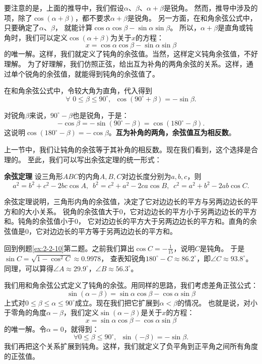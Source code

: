 \documentclass[12pt,UTF8]{ctexbook}
\begin{document}
要注意的是，上面的推导中，我们假设$\alpha$、$\beta$、$\alpha + \beta$是锐角。
然而，推导中涉及的项，除了$\cos(\alpha + \beta)$，都不要求$\alpha + \beta$是锐角。
另一方面，在和角余弦公式中，只要确定了$\alpha$、$\beta$，
就能计算$\cos \alpha \cos \beta - \sin\alpha \sin \beta$。
所以，$\alpha + \beta$是直角或钝角时，我们可以定义$\cos(\alpha + \beta)$为关于$x$的方程：
$$  x = \cos \alpha \cos \beta - \sin\alpha \sin \beta $$
的唯一解。这样，我们就定义了钝角的余弦值。当然，这样定义钝角余弦值，不好理解。
为了好理解，我们仿照正弦，给出互为补角的两角余弦的关系。这样，通过单个锐角的余弦值，就能得到钝角的余弦值了。

在和角余弦公式中，令较大角为直角，代入得到
$$  \forall \,\, 0 \leqslant \beta \leqslant 90^\circ , \,\,\, \cos(90^\circ + \beta) = - \sin\beta. $$

对锐角$\beta$来说，$90^\circ - \beta$也是锐角，于是：
$$ -\cos \beta = - \sin(90^\circ - \beta) = \cos(180^\circ - \beta). $$
这说明$ \cos(180^\circ - \beta) =  -\cos \beta$。\textbf{互为补角的两角，余弦值互为相反数}。

上一节中，我们让钝角的余弦等于其补角的相反数。现在我们看到，这个选择是合理的。
至此，我们可以写出余弦定理的统一形式：

\begin{tm}{\textbf{余弦定理}}\label{tm:2-4-10}
    设三角形$ABC$的内角$A,B,C$对边长度分别为$a,b,c$，则
    $$ a^2 = b^2 + c^2 - 2bc\cos A, \,\,\, b^2 = c^2 + a^2 - 2ca\cos B, \,\,\, c^2 = a^2 + b^2 - 2ab\cos C. $$
\end{tm}
余弦定理说明，三角形内角的余弦值，决定了它对边边长的平方与另两边边长的平方和的大小关系。
锐角的余弦值大于$0$，它对边边长的平方小于另两边边长的平方和。钝角的余弦值小于$0$，
它对边边长的平方大于另两边边长的平方和。直角的余弦值是$0$，它对边边长的平方等于另两边边长的平方和。

回到例题\ref{ex:2-2-10}第二题。之前我们算出$\cos C = -\frac{1}{15}$，说明$C$是钝角。
于是$\sin C = \sqrt{1 - \cos^2 C} \approx 0.9978$，
查表知锐角$180^\circ - C \approx 86.2^\circ$，即$\angle C \approx 93.8^\circ$。
同理，可以算得$\angle A \approx 29.9^\circ$，$\angle B \approx 56.3^\circ$。

我们用和角余弦公式定义了钝角的余弦。用同样的思路，我们考虑差角正弦公式：
$$ \sin(\alpha - \beta) = \sin\alpha \cos \beta - \cos \alpha \sin\beta $$
上式对$0 \leqslant \beta \leqslant \alpha \leqslant 90^\circ$成立。现在我们把它扩展到$\alpha < \beta$的情况。
也就是说，对小于零角的角度$\alpha - \beta$，我们定义$\sin (\alpha - \beta)$是关于$x$的方程：
$$ x = \sin\alpha \cos \beta - \cos \alpha \sin\beta $$
的唯一解。令$\alpha = 0$，就得到：
$$ \forall 0 \leqslant \beta \leqslant 90^\circ , \,\,\, \sin(- \beta) = -\sin\beta. $$
我们再把这个关系扩展到钝角。这样，我们就定义了负平角到正平角之间所有角度的正弦值。
\end{document}
